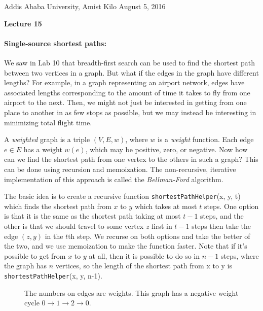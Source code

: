 \documentclass[11pt]{article}
\newlength{\toppush}
\newcommand{\htitle}[2]{\noindent\vspace*{-\toppush}\newline\parbox{6.5in}
 {\large Addis Ababa University, Amist Kilo \hfill #1\newline
\hspace*{\fill}{\bf Algorithms and Programming for High Schoolers} \hspace*{\fill} \newline
\mbox{}\hrulefill\mbox{}}\vspace*{1ex}\mbox{}\newline
\begin{center}{\Large\bf #2}\end{center}}
\begin{document}
\htitle{August 5, 2016}{Lecture 15}

\paragraph{\Large Single-source shortest paths:}

We saw in Lab 10 that breadth-first search can be used to find the
shortest path between two vertices in a graph.  But what if the edges
in the graph have different lengths?  For example, in a graph
representing an airport network, edges have associated lengths
corresponding to the amount of time it takes to fly from one airport
to the next.  Then, we might not just be interested in getting from
one place to another in as few stops as possible, but we may instead
be interesting in minimizing total flight time.

A {\em weighted} graph is a triple $(V, E, w)$, where $w$ is a {\em
  weight} function.  Each edge $e\in E$ has a weight $w(e)$, which may
be positive, zero, or negative.  Now how can we find the shortest path
from one vertex to the others in such a graph?  This can be done using
recursion and memoization.  The non-recursive, iterative
implementation of this
approach is called the {\em Bellman-Ford} algorithm.

The basic idea is to create a recursive function
\texttt{shortestPathHelper}(x, y, t) which finds the shortest path
from $x$ to $y$ which takes at most $t$ steps.  One option is that it is the
same as the shortest path taking at most $t-1$ steps, and the other is
that we should travel to some vertex $z$ first in $t-1$ steps then
take the edge $(z,y)$ in the $t$th step.  We recurse on
both options and take the better of the two, and we use memoization to
make the function faster.
Note that if it's possible to get from $x$ to $y$ at all, then it is
possible to do so in $n-1$ steps, where the graph has $n$ vertices, so
the length of the shortest path from x to y is
\texttt{shortestPathHelper}(x, y, n-1).

\begin{figure}[!!h]
\begin{center}
\end{center}
\caption{The numbers on edges are weights. This graph has a negative
  weight cycle $0\rightarrow 1\rightarrow 2\rightarrow 0$.}
\end{figure}
\end{document}
